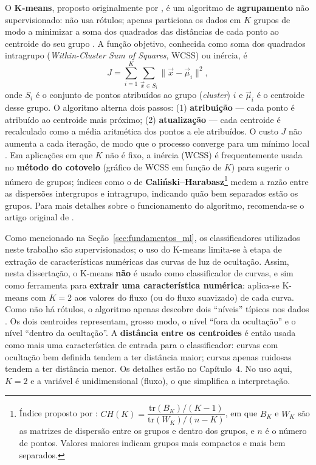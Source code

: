 O \textbf{K-means}, proposto originalmente por \citet{MacQueen1967}, é um algoritmo de \textbf{agrupamento} não supervisionado: não usa rótulos; apenas particiona os dados em \(K\) grupos de modo a minimizar a soma dos quadrados das distâncias de cada ponto ao centroide do seu grupo \citep{geron2019maos, Levada2026}. A função objetivo, conhecida como soma dos quadrados intragrupo (\textit{Within-Cluster Sum of Squares}, WCSS) ou inércia, é
\begin{equation}
J = \sum_{i=1}^{K} \sum_{\vec{x} \in S_i} \|\vec{x} - \vec{\mu}_i\|^2,
\end{equation}
onde \(S_i\) é o conjunto de pontos atribuídos ao grupo (\textit{cluster}) \(i\) e \(\vec{\mu}_i\) é o centroide desse grupo. O algoritmo alterna dois passos: (1) \textbf{atribuição} --- cada ponto é atribuído ao centroide mais próximo; (2) \textbf{atualização} --- cada centroide é recalculado como a média aritmética dos pontos a ele atribuídos. O custo \(J\) não aumenta a cada iteração, de modo que o processo converge para um mínimo local \citep{geron2019maos, Levada2026}. Em aplicações em que \(K\) não é fixo, a inércia (WCSS) é frequentemente usada no \textbf{método do cotovelo} (gráfico de WCSS em função de \(K\)) para sugerir o número de grupos; índices como o de \textbf{Cali\'nski--Harabasz}\footnote{Índice proposto por \citet{Calinski1974}: $CH(K) = \dfrac{\mathrm{tr}(B_K)/(K-1)}{\mathrm{tr}(W_K)/(n-K)}$, em que $B_K$ e $W_K$ são as matrizes de dispersão entre os grupos e dentro dos grupos, e $n$ é o número de pontos. Valores maiores indicam grupos mais compactos e mais bem separados.} medem a razão entre as dispersões intergrupos e intragrupo, indicando quão bem separados estão os grupos. Para mais detalhes sobre o funcionamento do algoritmo, recomenda-se o artigo original de \citet{MacQueen1967}.

Como mencionado na Seção~\ref{sec:fundamentos_ml}, os classificadores utilizados neste trabalho são supervisionados; o uso do K-means limita-se à etapa de extração de características numéricas das curvas de luz de ocultação. Assim, nesta dissertação, o K-means \textbf{não} é usado como classificador de curvas, e sim como ferramenta para \textbf{extrair uma característica numérica}: aplica-se K-means com \(K=2\) aos valores do fluxo (ou do fluxo suavizado) de cada curva. Como não há rótulos, o algoritmo apenas descobre dois ``níveis'' típicos nos dados \citep{Levada2026}. Os dois centroides representam, grosso modo, o nível ``fora da ocultação'' e o nível ``dentro da ocultação''. A \textbf{distância entre os centroides} é então usada como mais uma característica de entrada para o classificador: curvas com ocultação bem definida tendem a ter distância maior; curvas apenas ruidosas tendem a ter distância menor. Os detalhes estão no Capítulo~4. No uso aqui, \(K=2\) e a variável é unidimensional (fluxo), o que simplifica a interpretação.

